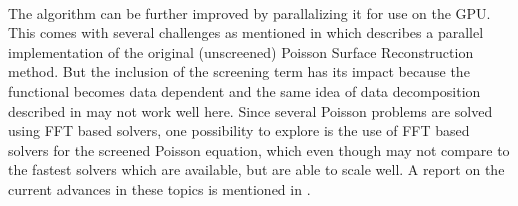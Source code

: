 \documentclass[12pt,a4paper]{article}
\begin{document}
\paragraph{}The algorithm can be further improved by parallalizing it for use on the GPU. This comes with several challenges as mentioned in  \cite{Bolitho:2009:PPS:1696121.1696195} which describes a parallel implementation of the original (unscreened) Poisson Surface Reconstruction method. But the inclusion of the screening term has its impact because the functional becomes data dependent and the same idea of data decomposition described in \cite{Bolitho:2009:PPS:1696121.1696195} may not work well here. Since several Poisson problems are solved using FFT based solvers, one possibility to explore is the use of FFT based solvers for the screened Poisson equation, which even though may not compare to the fastest solvers which are available, but are able to scale well. A report on the current advances in these topics is mentioned in \cite{egst.20141040}.



\end{document}
